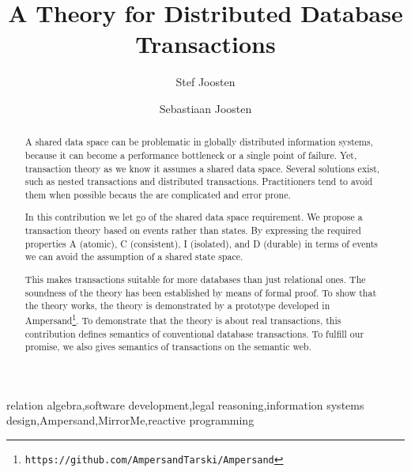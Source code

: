 \documentclass{elsarticle}
\begin{document}
\title{A Theory for Distributed Database Transactions}
\author[ou,ordina]{Stef Joosten}
\author[utwente]{Sebastiaan Joosten}
\address[ou]{Open Universiteit Nederland, Postbus 2960, 6401 DL Heerlen, the Netherlands}
\address[ordina]{Ordina NV, Nieuwegein, the Netherlands}
\address[utwente]{University of Twente, Enschede, the Netherlands}

\begin{abstract}
	A shared data space can be problematic in globally distributed information systems,
	because it can become a performance bottleneck or a single point of failure.
	Yet, transaction theory as we know it assumes a shared data space.
	Several solutions exist, such as nested transactions and distributed transactions.
	Practitioners tend to avoid them when possible becaus the are complicated and error prone.

	In this contribution we let go of the shared data space requirement.
	We propose a transaction theory based on events rather than states.
	By expressing the required properties A (atomic), C (consistent), I (isolated), and D (durable)
	in terms of events we can avoid the assumption of a shared state space.

	This makes transactions suitable for more databases than just relational ones.
	The soundness of the theory has been established by means of formal proof.
	To show that the theory works, the theory is demonstrated by a prototype developed in Ampersand\footnote{\tt https://github.com/AmpersandTarski/Ampersand}.
	To demonstrate that the theory is about real transactions, this contribution defines semantics of conventional database transactions.
	To fulfill our promise, we also gives semantics of transactions on the semantic web.
\end{abstract}

\begin{keyword}
relation algebra\sep software development\sep legal reasoning\sep information systems design\sep Ampersand\sep MirrorMe\sep reactive programming
\end{keyword}
\maketitle
\end{document}
